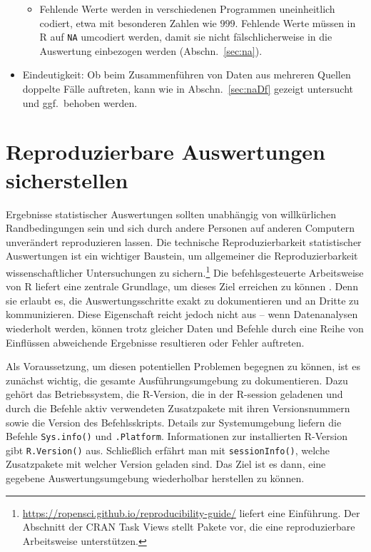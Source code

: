\begin{itemize}
\begin{itemize}
\item Fehlende Werte werden in verschiedenen Programmen uneinheitlich codiert, etwa mit besonderen Zahlen wie $999$. Fehlende Werte müssen in R auf \lstinline!NA! umcodiert werden, damit sie nicht fälschlicherweise in die Auswertung einbezogen werden (Abschn.\ \ref{sec:na}).
\end{itemize}
\item Eindeutigkeit: Ob beim Zusammenführen von Daten aus mehreren Quellen doppelte Fälle auftreten, kann wie in Abschn.\ \ref{sec:naDf} gezeigt untersucht und ggf.\ behoben werden.
\end{itemize}

\section{Reproduzierbare Auswertungen sicherstellen}
\label{sec:reproducibility}

Ergebnisse statistischer Auswertungen sollten unabhängig von willkürlichen Randbedingungen sein und sich durch andere Personen auf anderen Computern unverändert reproduzieren lassen. Die technische Reproduzierbarkeit statistischer Auswertungen ist ein wichtiger Baustein, um allgemeiner die Reproduzierbarkeit wissenschaftlicher Untersuchungen zu sichern.\footnote{\url{https://ropensci.github.io/reproducibility-guide/} liefert eine Einführung. Der Abschnitt  der CRAN Task Views \cite{CRANtvReprRer} stellt Pakete vor, die eine reproduzierbare Arbeitsweise unterstützen.} Die befehlsgesteuerte Arbeitsweise von R liefert eine zentrale Grundlage, um dieses Ziel erreichen zu können \cite{Gandrud2014}. Denn sie erlaubt es, die Auswertungsschritte exakt zu dokumentieren und an Dritte zu kommunizieren. Diese Eigenschaft reicht jedoch nicht aus -- wenn Datenanalysen wiederholt werden, können trotz gleicher Daten und Befehle durch eine Reihe von Einflüssen abweichende Ergebnisse resultieren oder Fehler auftreten.

Als Voraussetzung, um diesen potentiellen Problemen begegnen zu können, ist es zunächst wichtig, die gesamte Ausführungsumgebung zu dokumentieren. Dazu gehört das Betriebssystem, die R-Version, die in der R-session geladenen und durch die Befehle aktiv verwendeten Zusatzpakete mit ihren Versionsnummern sowie die Version des Befehlsskripts. Details zur Systemumgebung liefern die Befehle \lstinline!Sys.info()! und  \lstinline!.Platform!. Informationen zur installierten R-Version gibt  \lstinline!R.Version()! aus. Schließlich erfährt man mit  \lstinline!sessionInfo()!, welche Zusatzpakete mit welcher Version geladen sind. Das Ziel ist es dann, eine gegebene Auswertungsumgebung wiederholbar herstellen zu können.


